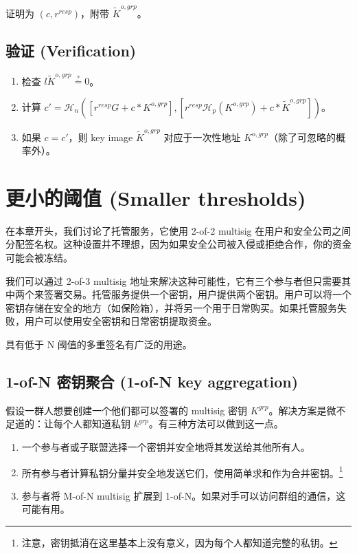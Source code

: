 证明为 $(c,r^{resp})$，附带 $\tilde{K}^{o,grp}$。


\subsection*{验证 (Verification)}

\begin{enumerate}
    \item 检查 $l \tilde{K}^{o,grp} \stackrel{?}{=} 0$。
    \item 计算 $c' = \mathcal{H}_n([r^{resp} G + c*K^{o,grp}],[r^{resp} \mathcal{H}_p(K^{o,grp}) + c*\tilde{K}^{o,grp}])$。
    \item 如果 $c = c'$，则 key image $\tilde{K}^{o,grp}$ 对应于一次性地址 $K^{o,grp}$（除了可忽略的概率外）。
\end{enumerate}


\section{更小的阈值 (Smaller thresholds)}
\label{sec:smaller-thresholds}

在本章开头，我们讨论了托管服务，它使用 2-of-2 multisig 在用户和安全公司之间分配签名权。这种设置并不理想，因为如果安全公司被入侵或拒绝合作，你的资金可能会被冻结。

我们可以通过 2-of-3 multisig 地址来解决这种可能性，它有三个参与者但只需要其中两个来签署交易。托管服务提供一个密钥，用户提供两个密钥。用户可以将一个密钥存储在安全的地方（如保险箱），并将另一个用于日常购买。如果托管服务失败，用户可以使用安全密钥和日常密钥提取资金。

具有低于 N 阈值的多重签名有广泛的用途。


\subsection{1-of-N 密钥聚合 (1-of-N key aggregation)}
\label{sec:1-of-n}

假设一群人想要创建一个他们都可以签署的 multisig 密钥 $K^{grp}$。解决方案是微不足道的：让每个人都知道私钥 $k^{grp}$。有三种方法可以做到这一点。
\begin{enumerate}
    \item 一个参与者或子联盟选择一个密钥并安全地将其发送给其他所有人。
    \item 所有参与者计算私钥分量并安全地发送它们，使用简单求和作为合并密钥。\footnote{注意，密钥抵消在这里基本上没有意义，因为每个人都知道完整的私钥。}
    \item 参与者将 M-of-N multisig 扩展到 1-of-N。如果对手可以访问群组的通信，这可能有用。
\end{enumerate}

